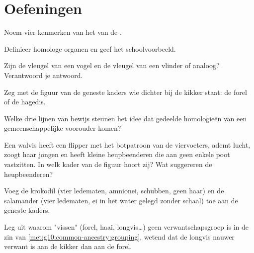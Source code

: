 \section{Oefeningen}

\begin{exercise}[$\star$]\label{exo:g10:common-ancestry:1}
Noem vier kenmerken van het  van de .
\end{exercise}

\begin{exercise}[$\star$]\label{exo:g10:common-ancestry:2}
Definieer homologe organen en geef het schoolvoorbeeld.
\end{exercise}

\begin{exercise}[$\star$]\label{exo:g10:common-ancestry:3}
Zijn de vleugel van een vogel en de vleugel van een vlinder  of
analoog? Verantwoord je antwoord.
\end{exercise}

\begin{exercise}[$\star$]\label{exo:g10:common-ancestry:4}
Zeg met de figuur van de geneste kaders wie dichter bij de kikker staat:
de forel of de hagedis.
\end{exercise}

\begin{exercise}[$\star$]\label{exo:g10:common-ancestry:5}
Welke drie lijnen van bewijs steunen het idee dat gedeelde homologieën
van een gemeenschappelijke voorouder komen?
\end{exercise}

\begin{exercise}[$\star\star$]\label{exo:g10:common-ancestry:6}
Een walvis heeft een flipper met het botpatroon van de viervoeters,
ademt lucht, zoogt haar jongen en heeft kleine heupbeenderen die aan
geen enkele poot vastzitten. In welk kader van de figuur hoort zij? Wat
suggereren de heupbeenderen?
\end{exercise}

\begin{exercise}[$\star\star$]\label{exo:g10:common-ancestry:7}
Voeg de krokodil (vier ledematen, amnionei, schubben, geen haar) en de
salamander (vier ledematen, ei in het water gelegd zonder schaal) toe
aan de geneste kaders.
\end{exercise}

\begin{exercise}[$\star\star$]\label{exo:g10:common-ancestry:8}
Leg uit waarom "vissen" (forel, haai, longvis\dots) geen
verwantschapsgroep is in de zin van
\cref{met:g10:common-ancestry:grouping}, wetend dat de longvis nauwer
verwant is aan de kikker dan aan de forel.
\end{exercise}

